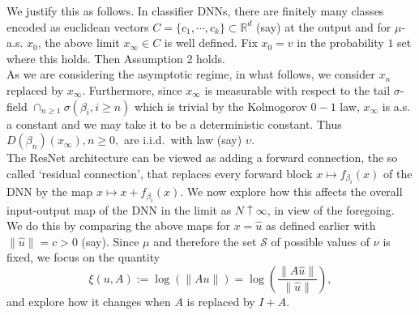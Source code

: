 \documentclass[12pt]{amsart}
\theoremstyle{plain}
\newtheorem{lemma}[theorem]{Lemma}
\theoremstyle{definition}
\theoremstyle{remark}
\newcommand{\R}{\mathbb{R}}
\newcommand{\PA}{\mathcal{P}}
\newcommand{\SA}{\mathcal{S}}
\newcommand{\0}{\textbf{0}}
\newcommand{\HA}{\mathcal{H}}
\begin{document}
We justify this as follows. In classifier DNNs, there are finitely many classes encoded as euclidean vectors $C = \{c_1, \cdots , c_k\} \subset \R^d$ (say) at the output and for $\mu$-a.s. $x_0$, the above limit $x_\infty \in C$ is well defined. Fix $x_0 = v$ in the probability $1$ set where this holds. Then Assumption 2 holds.\\

As we are considering the asymptotic regime, in what follows, we consider $x_n$ replaced by $x_\infty$. Furthermore, since $x_\infty$ is measurable with respect to the tail $\sigma$-field $\cap_{n \geq 1}\sigma(\beta_i, i \geq n)$ which is trivial by the Kolmogorov $0-1$ law, $x_\infty$ is a.s. a constant and we may take it to be a deterministic constant. Thus $D(\beta_n)(x_\infty), n \geq 0,$ are i.i.d.\ with law (say) $\upsilon$.\\

The ResNet architecture can be viewed as adding a forward connection, the so called `residual connection', that replaces every forward block $x \mapsto f_{\beta_i}(x)$ of the DNN by the map $x \mapsto x + f_{\beta_i}(x)$. We now explore how this affects the overall input-output map of the DNN in the limit as $N \uparrow \infty$, in view of the foregoing.\\

We do this by comparing the above maps for $x = \hat{u}$ as defined earlier with $\|\hat{u}\| = c > 0$ (say).  Since $\mu$ and therefore the set $\SA$ of possible values of $\nu$ is fixed, we focus on the quantity 
$$\xi(u, A) := \log(\|Au\|) = \log\left(\frac{\|A\hat{u}\|}{\|\hat{u}\|}\right),$$
and explore how it changes when $A$ is replaced by $I + A$.  \\

%
%
%
\end{document}
